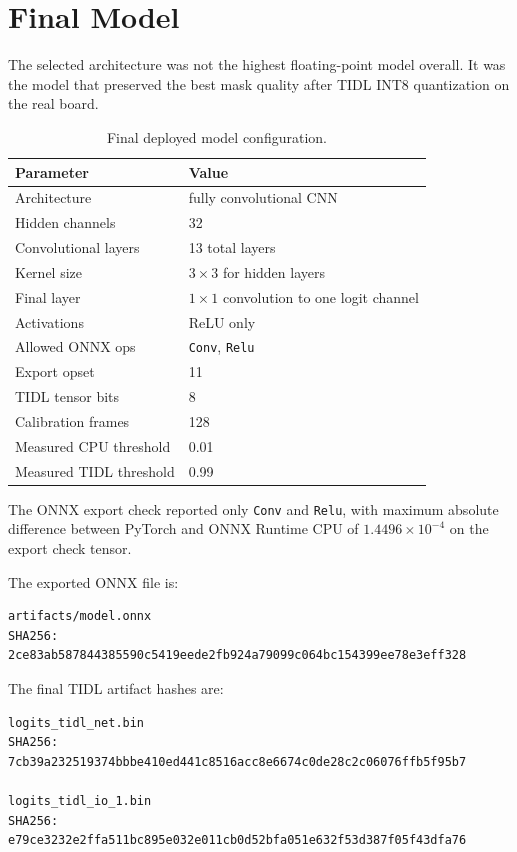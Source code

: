 \documentclass[11pt,a4paper]{article}
\begin{document}
\section{Final Model}

The selected architecture was not the highest floating-point model overall.  It was the model that preserved the best mask quality after TIDL INT8 quantization on the real board.

\begin{table}[H]
\centering
\caption{Final deployed model configuration.}
\begin{tabular}{ll}
\toprule
Parameter & Value \\
\midrule
Architecture & fully convolutional CNN \\
Hidden channels & 32 \\
Convolutional layers & 13 total layers \\
Kernel size & $3\times3$ for hidden layers \\
Final layer & $1\times1$ convolution to one logit channel \\
Activations & ReLU only \\
Allowed ONNX ops & \texttt{Conv}, \texttt{Relu} \\
Export opset & 11 \\
TIDL tensor bits & 8 \\
Calibration frames & 128 \\
Measured CPU threshold & 0.01 \\
Measured TIDL threshold & 0.99 \\
\bottomrule
\end{tabular}
\end{table}

The ONNX export check reported only \texttt{Conv} and \texttt{Relu}, with maximum absolute difference between PyTorch and ONNX Runtime CPU of $1.4496\times10^{-4}$ on the export check tensor.

The exported ONNX file is:

\begin{lstlisting}
artifacts/model.onnx
SHA256: 2ce83ab587844385590c5419eede2fb924a79099c064bc154399ee78e3eff328
\end{lstlisting}

The final TIDL artifact hashes are:

\begin{lstlisting}
logits_tidl_net.bin
SHA256: 7cb39a232519374bbbe410ed441c8516acc8e6674c0de28c2c06076ffb5f95b7

logits_tidl_io_1.bin
SHA256: e79ce3232e2ffa511bc895e032e011cb0d52bfa051e632f53d387f05f43dfa76
\end{lstlisting}
\end{document}
